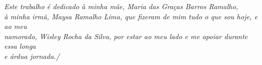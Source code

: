 \begin{dedicatoria}
   \vspace*{\fill}
   \centering
   \noindent
   \textit{Este trabalho é dedicado à minha mãe, Maria das Graças Barros Ramalho, \\
   à minha irmã, Maysa Ramalho Lima, que fizeram de mim tudo o que sou hoje, e ao meu \\
   namorado, Wisley Rocha da Silva, por estar ao meu lado e me apoiar durante essa longa \\
   e árdua jornada./} \vspace*{\fill}
\end{dedicatoria}
